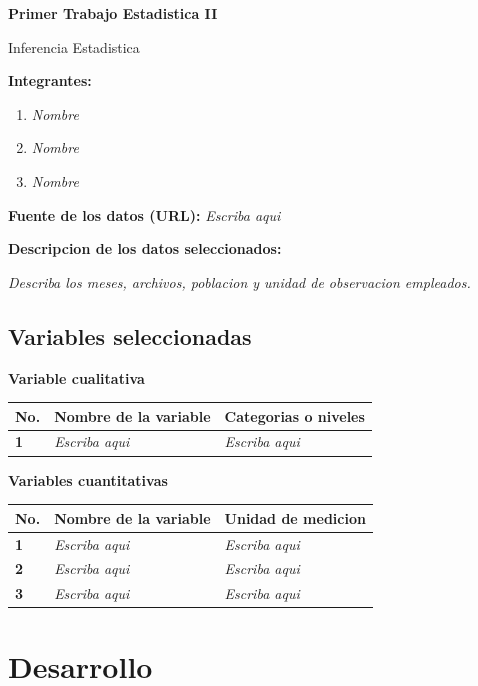 \documentclass[12pt,letterpaper]{article}
\newcommand{\respuesta}[1][Escriba aqui]{\textcolor{gristexto}{\textit{#1}}}
\begin{document}
\begin{center}
  {\LARGE\bfseries\color{azulcurso} Primer Trabajo Estadistica II}\par
  \vspace{3pt}
  {\large Inferencia Estadistica}
\end{center}

\vspace{8pt}
\textbf{Integrantes:}
\begin{enumerate}[leftmargin=1.6cm]
  \item \respuesta[Nombre]
  \item \respuesta[Nombre]
  \item \respuesta[Nombre]
\end{enumerate}

\textbf{Fuente de los datos (URL):} \respuesta

\textbf{Descripcion de los datos seleccionados:}

\respuesta[Describa los meses, archivos, poblacion y unidad de observacion empleados.]

\subsection*{Variables seleccionadas}

\textbf{Variable cualitativa}

\begin{tabularx}{\textwidth}{>{\bfseries}p{1.2cm} Y Y}
\toprule
No. & Nombre de la variable & Categorias o niveles \\
 & \respuesta & \respuesta \\
\bottomrule
\end{tabularx}

\vspace{8pt}
\textbf{Variables cuantitativas}

\begin{tabularx}{\textwidth}{>{\bfseries}p{1.2cm} Y Y}
\toprule
No. & Nombre de la variable & Unidad de medicion \\
 & \respuesta & \respuesta \\
2 & \respuesta & \respuesta \\
3 & \respuesta & \respuesta \\
\bottomrule
\end{tabularx}

\section{Desarrollo}
\end{document}
